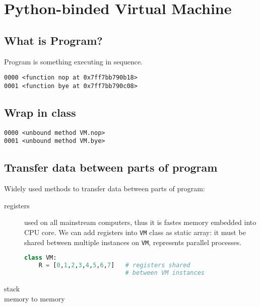 \chapter{Python-binded Virtual Machine}
\clearpage

\section{What is Program?}

Program is something executing in sequence.


\begin{lstlisting}
0000 <function nop at 0x7ff7bb790b18>
0001 <function bye at 0x7ff7bb790c08>
\end{lstlisting}

\section{Wrap in class}


\begin{lstlisting}
0000 <unbound method VM.nop>
0001 <unbound method VM.bye>
\end{lstlisting}

\section{Transfer data between parts of program}

Widely used methods to transfer data between parts of program:
\begin{description}
\item[registers] used on all mainstream computers, thus it is fastes memory
embedded into CPU core. 
We can add registers into \verb|VM| class as static array: it must be shared
between multiple instances on \verb|VM|, represents parallel processes.

\begin{lstlisting}[language=Python]
class VM:
    R = [0,1,2,3,4,5,6,7]	# registers shared
    						# between VM instances
\end{lstlisting} 
\item[stack]
\item[memory to memory]
\end{description}
